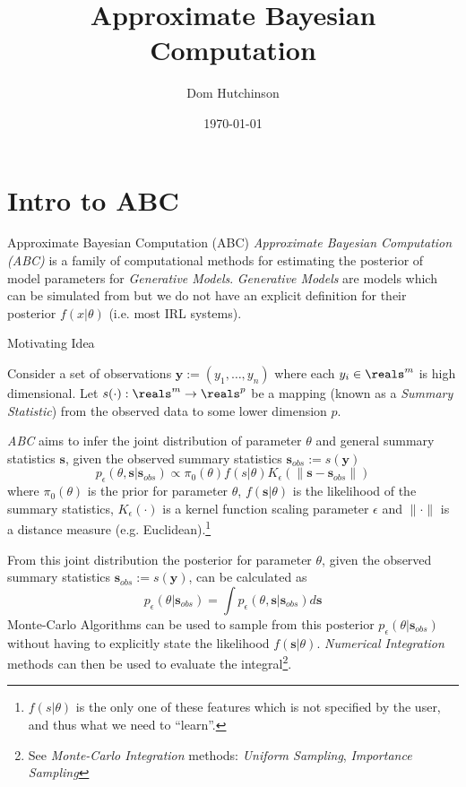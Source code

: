 \documentclass[11pt,a4paper]{article}
\begin{document}
\setcounter{section}{1}

\title{Approximate Bayesian Computation}
\author{Dom Hutchinson}
\date{\today}
\maketitle

\section*{Intro to ABC}

\begin{definition}{Approximate Bayesian Computation (ABC)}
  \textit{Approximate Bayesian Computation (ABC)} is a family of computational methods for estimating the posterior of model parameters for \textit{Generative Models}. \textit{Generative Models} are models which can be simulated from but we do not have an explicit definition for their posterior $f(x|\theta)$ (i.e. most IRL systems).
\end{definition}

\begin{proposition}{Motivating Idea}
  \par Consider a set of observations $\mathbf{y}:=(y_1,\dots,y_n)$ where each $y_i\in\reals^m$ is high dimensional. Let $s(\cdot):\reals^m\to\reals^p$ be a mapping (known as a \textit{Summary Statistic}) from the observed data to some lower dimension $p$.
  \par \textit{ABC} aims to infer the joint distribution of parameter $\theta$ and general summary statistics $\mathbf{s}$, given the observed summary statistics $\mathbf{s}_{obs}:=s(\mathbf{y})$
  \[ p_\epsilon(\theta,\mathbf{s}|\mathbf{s}_{obs})\propto\pi_0(\theta)f(s|\theta)K_\epsilon(\|\mathbf{s}-\mathbf{s}_{obs}\|) \]
  where $\pi_0(\theta)$ is the prior for parameter $\theta$, $f(\mathbf{s}|\theta)$ is the likelihood of the summary statistics, $K_\epsilon(\cdot)$ is a kernel function scaling parameter $\epsilon$ and $\|\cdot\|$ is a distance measure (e.g. Euclidean).\footnote{$f(s|\theta)$ is the only one of these features which is not specified by the user, and thus what we need to ``learn''.}
  \par From this joint distribution the posterior for parameter $\theta$, given the observed summary statistics $\mathbf{s}_{obs}:=s(\mathbf{y})$, can be calculated as
  \[ p_\epsilon(\theta|\mathbf{s}_{obs})=\int p_\epsilon(\theta,\mathbf{s}|\mathbf{s}_{obs})d\mathbf{s} \]
  Monte-Carlo Algorithms can be used to sample from this posterior $p_\epsilon(\theta|\mathbf{s}_{obs})$ without having to explicitly state the likelihood $f(\mathbf{s}|\theta)$. \textit{Numerical Integration} methods can then be used to evaluate the integral\footnote{See \textit{Monte-Carlo Integration} methods: \textit{Uniform Sampling}, \textit{Importance Sampling}}.
\end{proposition}
\end{document}
